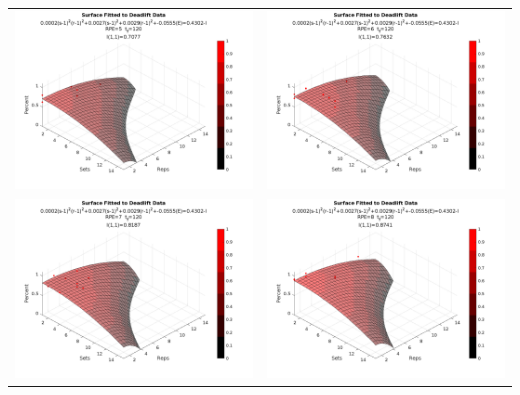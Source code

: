 \begin{table}[h]
    \centering
    \begin{tabular}{c|c}
        \includegraphics[width=80mm]{DeadliftSurface/5.png} &  
        \includegraphics[width=80mm]{DeadliftSurface/6.png} \\
         
        \includegraphics[width=80mm]{DeadliftSurface/7.png} &
        \includegraphics[width=80mm]{DeadliftSurface/8.png} \\
        

\end{tabular}
\end{table}
